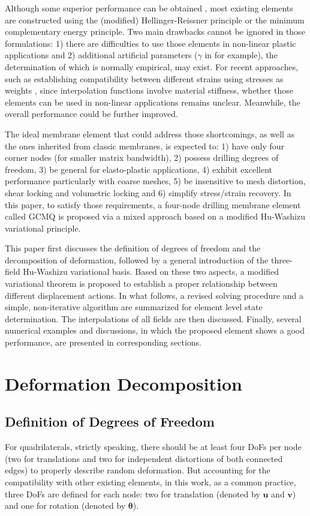 \documentclass[3p,sort&compress,review,11pt]{elsarticle}
\begin{document}
Although some superior performance can be obtained \citep[e.g.,][]{Choi2006,Choo2006,Cen2011}, most existing elements are constructed using the (modified) Hellinger-Reissner principle or the minimum complementary energy principle. Two main drawbacks cannot be ignored in those formulations: 1) there are difficulties to use those elements in non-linear plastic applications and 2) additional artificial parameters ($\gamma$ in \citep{Hughes1989} for example), the determination of which is normally empirical, may exist. For recent approaches, such as establishing compatibility between different strains using stresses as weights \citep{Wang2016,Shang2017}, since interpolation functions involve material stiffness, whether those elements can be used in non-linear applications remains unclear. Meanwhile, the overall performance could be further improved.

The ideal membrane element that could address those shortcomings, as well as the ones inherited from classic membranes, is expected to: 1) have only four corner nodes (for smaller matrix bandwidth), 2) possess drilling degrees of freedom, 3) be general for elasto-plastic applications, 4) exhibit excellent performance particularly with coarse meshes, 5) be insensitive to mesh distortion, shear locking and volumetric locking and 6) simplify stress/strain recovery. In this paper, to satisfy those requirements, a four-node drilling membrane element called GCMQ is proposed via a mixed approach based on a modified Hu-Washizu variational principle.

This paper first discusses the definition of degrees of freedom and the decomposition of deformation, followed by a general introduction of the three-field Hu-Washizu variational basis. Based on these two aspects, a modified variational theorem is proposed to establish a proper relationship between different displacement actions. In what follows, a revised solving procedure and a simple, non-iterative algorithm are summarized for element level state determination. The interpolations of all fields are then discussed. Finally, several numerical examples and discussions, in which the proposed element shows a good performance, are presented in corresponding sections.
\section{Deformation Decomposition}
\subsection{Definition of Degrees of Freedom}
For quadrilaterals, strictly speaking, there should be at least four DoFs per node (two for translations and two for independent distortions of both connected edges) to properly describe random deformation. But accounting for the compatibility with other existing elements, in this work, as a common practice, three DoFs are defined for each node: two for translation (denoted by $\mathbold{u}$ and $\mathbold{v}$) and one for rotation (denoted by $\mathbold{\theta}$).
\end{document}
